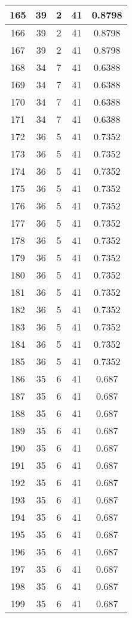 \documentclass[letterpaper, 12pt]{article}
\begin{document}
\begin{longtable}{|c|c|c|c|c|}
\hline
165 & 39 & 2 & 41 & 0.8798 \\
\hline
166 & 39 & 2 & 41 & 0.8798 \\
\hline
167 & 39 & 2 & 41 & 0.8798 \\
\hline
168 & 34 & 7 & 41 & 0.6388 \\
\hline
169 & 34 & 7 & 41 & 0.6388 \\
\hline
170 & 34 & 7 & 41 & 0.6388 \\
\hline
171 & 34 & 7 & 41 & 0.6388 \\
\hline
172 & 36 & 5 & 41 & 0.7352 \\
\hline
173 & 36 & 5 & 41 & 0.7352 \\
\hline
174 & 36 & 5 & 41 & 0.7352 \\
\hline
175 & 36 & 5 & 41 & 0.7352 \\
\hline
176 & 36 & 5 & 41 & 0.7352 \\
\hline
177 & 36 & 5 & 41 & 0.7352 \\
\hline
178 & 36 & 5 & 41 & 0.7352 \\
\hline
179 & 36 & 5 & 41 & 0.7352 \\
\hline
180 & 36 & 5 & 41 & 0.7352 \\
\hline
181 & 36 & 5 & 41 & 0.7352 \\
\hline
182 & 36 & 5 & 41 & 0.7352 \\
\hline
183 & 36 & 5 & 41 & 0.7352 \\
\hline
184 & 36 & 5 & 41 & 0.7352 \\
\hline
185 & 36 & 5 & 41 & 0.7352 \\
\hline
186 & 35 & 6 & 41 & 0.687 \\
\hline
187 & 35 & 6 & 41 & 0.687 \\
\hline
188 & 35 & 6 & 41 & 0.687 \\
\hline
189 & 35 & 6 & 41 & 0.687 \\
\hline
190 & 35 & 6 & 41 & 0.687 \\
\hline
191 & 35 & 6 & 41 & 0.687 \\
\hline
192 & 35 & 6 & 41 & 0.687 \\
\hline
193 & 35 & 6 & 41 & 0.687 \\
\hline
194 & 35 & 6 & 41 & 0.687 \\
\hline
195 & 35 & 6 & 41 & 0.687 \\
\hline
196 & 35 & 6 & 41 & 0.687 \\
\hline
197 & 35 & 6 & 41 & 0.687 \\
\hline
198 & 35 & 6 & 41 & 0.687 \\
\hline
199 & 35 & 6 & 41 & 0.687 \\
\hline
\end{longtable}
\end{document}
